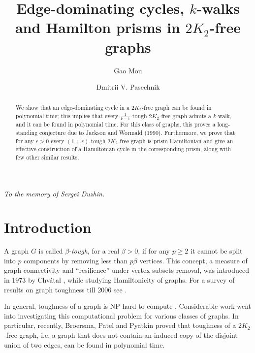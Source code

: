 \documentclass[runningheads,a4paper]{llncs}
\begin{document}
\mainmatter

\title{Edge-dominating cycles, $k$-walks and Hamilton prisms in $2K_2$-free graphs}

\author{Gao Mou \and Dmitrii V. Pasechnik}




\maketitle

\begin{flushright}
    \textit{To the memory of Sergei Duzhin.}
\end{flushright}

\begin{abstract}
We show that an edge-dominating cycle in a $2K_2$-free graph can be found
in polynomial time; this implies that every $\frac{1}{k-1}$-tough
$2K_2$-free graph admits a $k$-walk, and it can be found in polynomial time.
For this class of graphs, this proves a
long-standing conjecture due to Jackson and Wormald (1990).
Furthermore, we prove that for any $\epsilon>0$ every $(1+\epsilon)$-tough $2K_2$-free graph is prism-Hamiltonian
and give an effective construction of a Hamiltonian cycle in the corresponding prism,
along with few other similar results.
\end{abstract}


\section{Introduction}
A graph $G$ is called $\beta$-{\em tough}, for a real $\beta>0$, if for any $p\geq 2$ it
cannot be split into $p$ components by removing less than $p\beta$ vertices.  
This concept, a measure of graph connectivity and ``resilience'' under vertex subsets removal,
was introduced in 1973 by Chv\'{a}tal \cite{chvatal1973tough},
while studying   Hamiltonicity of graphs. For a survey of results on graph toughness till 2006
see \cite{MR2221006}. 

In general, toughness of a graph is NP-hard to compute 
\cite{MR1074858}. Considerable work went into investigating this computational problem for
various classes of graphs. In particular, recently, Broersma, Patel and Pyatkin proved
\cite{broersma2014toughness} that toughness of a $2K_2$-free graph, i.e. a graph that
does not contain an induced copy of the disjoint union of two edges,
can be found in polynomial time. 
\end{document}
